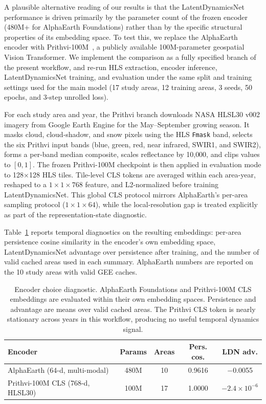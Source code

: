 \documentclass{article}
\begin{document}
A plausible alternative reading of our results is that the LatentDynamicsNet performance is driven primarily by the parameter count of the frozen encoder (480M+ for AlphaEarth Foundations) rather than by the specific structural properties of its embedding space. To test this, we replace the AlphaEarth encoder with Prithvi-100M~\citep{jakubik2024prithvi}, a publicly available 100M-parameter geospatial Vision Transformer. We implement the comparison as a fully specified branch of the present workflow, and re-run HLS extraction, encoder inference, LatentDynamicsNet training, and evaluation under the same split and training settings used for the main model (17 study areas, 12 training areas, 3 seeds, 50 epochs, and 3-step unrolled loss).

For each study area and year, the Prithvi branch downloads NASA HLSL30 v002 imagery from Google Earth Engine for the May--September growing season. It masks cloud, cloud-shadow, and snow pixels using the HLS \texttt{Fmask} band, selects the six Prithvi input bands (blue, green, red, near infrared, SWIR1, and SWIR2), forms a per-band median composite, scales reflectance by 10{,}000, and clips values to $[0,1]$. The frozen Prithvi-100M checkpoint is then applied in evaluation mode to 128$\times$128 HLS tiles. Tile-level CLS tokens are averaged within each area-year, reshaped to a $1 \times 1 \times 768$ feature, and L2-normalized before training LatentDynamicsNet. This global CLS protocol mirrors AlphaEarth's per-area sampling protocol ($1 \times 1 \times 64$), while the local-resolution gap is treated explicitly as part of the representation-state diagnostic.

Table~\ref{tab:encoder_ablation} reports temporal diagnostics on the resulting embeddings: per-area persistence cosine similarity in the encoder's own embedding space, LatentDynamicsNet advantage over persistence after training, and the number of valid cached areas used in each summary. AlphaEarth numbers are reported on the 10 study areas with valid GEE caches.

\begin{table}[htbp]
\centering
\caption{Encoder choice diagnostic. AlphaEarth Foundations and Prithvi-100M CLS embeddings are evaluated within their own embedding spaces. Persistence and advantage are means over valid cached areas. The Prithvi CLS token is nearly stationary across years in this workflow, producing no useful temporal dynamics signal.}
\label{tab:encoder_ablation}
\small
\begin{tabular*}{\textwidth}{@{\extracolsep{\fill}}lcccc@{}}
\toprule
Encoder & Params & Areas & Pers. cos. & LDN adv. \\
\midrule
AlphaEarth (64-d, multi-modal) & 480M & 10 & 0.9616 & $-$0.0055 \\
Prithvi-100M CLS (768-d, HLSL30) & 100M & 17 & 1.0000 & $-2.4 \times 10^{-6}$ \\
\bottomrule
\end{tabular*}
\end{table}
\end{document}
